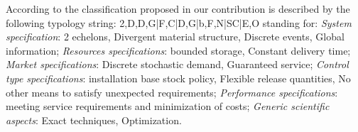 \documentclass[ijoc,sglanonrev]{informs4}
\begin{document}
According to the classification proposed in \cite{DEKOK2018} our contribution is described by the following typology string: 2,D,D,G|F,C|D,G|b,F,N|SC|E,O
standing for: {\it System specification}: 2 echelons, Divergent material structure, Discrete events, Global information; {\it Resources specifications}: bounded storage, Constant delivery time; {\it Market specifications}: Discrete stochastic demand, Guaranteed service; {\it Control type specifications}: installation base stock policy, Flexible release quantities, No other means to satisfy unexpected requirements; {\it Performance specifications}: meeting service requirements and minimization of costs; {\it Generic scientific aspects}: Exact techniques, Optimization.




\end{document}

